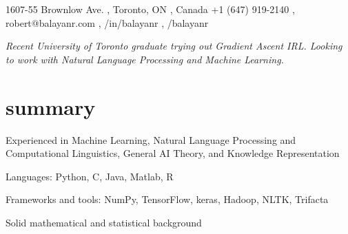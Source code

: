 \documentclass[]{cv-roald}
\begin{document}
\pagestyle{empty} %

{\faMapMarker \hspace{\FAspace} 1607-55 Brownlow Ave. \sep
Toronto, ON \sep 
Canada}
{\faMobile \hspace{\FAspace} +1 (647) 919-2140 \sep 
\faEnvelope \hspace{\FAspace} robert@balayanr.com \sep 
\faLinkedinSquare /in/balayanr \sep%
\faGithub /balayanr %
}

\textit{Recent University of Toronto graduate trying out Gradient Ascent IRL. Looking to work with Natural Language Processing and Machine Learning.}

\section*{summary}
\begin{tabitemize}
    \item Experienced in Machine Learning, Natural Language Processing and Computational Linguistics, General AI Theory, and Knowledge Representation
    \item Languages: Python, C, Java, Matlab, R
    \item Frameworks and tools: NumPy, TensorFlow, keras, Hadoop, NLTK, Trifacta
    \item Solid mathematical and statistical background
\end{tabitemize}
\end{document}
